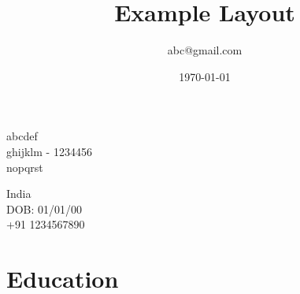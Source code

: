 \documentclass[10pt]{article}
\title{\bfseries\Huge Example Layout}
\author{abc@gmail.com}
\date{\today}
\begin{document}
	\begin{minipage}{0.65\textwidth}
		\begingroup
		\let\center\flushleft
		\let\endcenter\endflushleft
		\maketitle
		\endgroup
	\end{minipage}
\begin{minipage}{0.3\textwidth}
	\flushright{\rule{3.5cm}{4.5cm}}
\end{minipage}

\begin{minipage}[ht]{0.48\textwidth}
	abcdef\\
	ghijklm - 1234456\\
	nopqrst\\
\end{minipage}
\begin{minipage}[ht]{0.48\textwidth}
	India\\
	DOB: 01/01/00\\
	+91 1234567890\\
\end{minipage}

\section*{Education}

\end{document}

